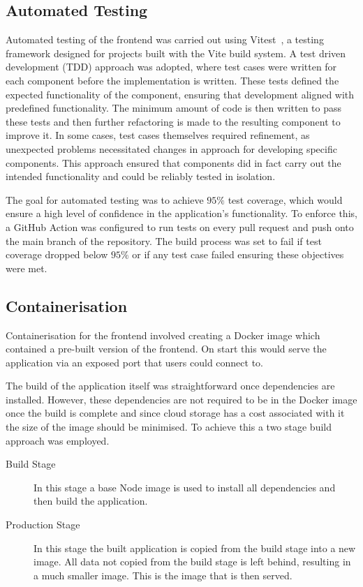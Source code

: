 \subsection{Automated Testing}
Automated testing of the frontend was carried out using Vitest~\cite{Vitest}, a testing framework designed for projects built with the Vite build system. A test driven development (TDD) approach was adopted, where test cases were written for each component before the implementation is written. These tests defined the expected functionality of the component, ensuring that development aligned with predefined functionality. The minimum amount of code is then written to pass these tests and then further refactoring is made to the resulting component to improve it. In some cases, test cases themselves required refinement, as unexpected problems necessitated changes in approach for developing specific components. This approach ensured that components did in fact carry out the intended functionality and could be reliably tested in isolation.

The goal for automated testing was to achieve $95\%$ test coverage, which would ensure a high level of confidence in the application's functionality. To enforce this, a GitHub Action was configured to run tests on every pull request and push onto the main branch of the repository. The build process was set to fail if test coverage dropped below $95\%$ or if any test case failed ensuring these objectives were met.

\subsection{Containerisation}
Containerisation for the frontend involved creating a Docker image which contained a pre-built version of the frontend. On start this would serve the application via an exposed port that users could connect to.

The build of the application itself was straightforward once dependencies are installed. However, these dependencies are not required to be in the Docker image once the build is complete and since cloud storage has a cost associated with it the size of the image should be minimised. To achieve this a two stage build approach was employed.

\begin{description}
    \item[Build Stage] In this stage a base Node image is used to install all dependencies and then build the application.
    \item[Production Stage] In this stage the built application is copied from the build stage into a new image. All data not copied from the build stage is left behind, resulting in a much smaller image. This is the image that is then served.
\end{description}

